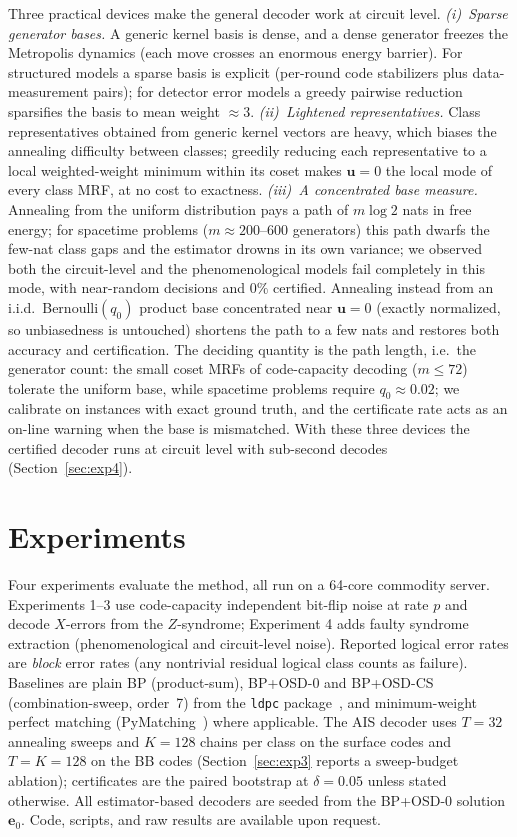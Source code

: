 \documentclass[a4paper,11pt]{quantumarticle}
\theoremstyle{definition}
\newcommand{\ve}{\boldsymbol{e}}
\newcommand{\vu}{\boldsymbol{u}}
\begin{document}
Three practical devices make the general decoder work at circuit level.
\emph{(i)~Sparse generator bases.} A generic kernel basis is dense, and a
dense generator freezes the Metropolis dynamics (each move crosses an
enormous energy barrier). For structured models a sparse basis is explicit
(per-round code stabilizers plus data-measurement pairs); for detector
error models a greedy pairwise reduction sparsifies the basis to mean
weight $\approx3$.
\emph{(ii)~Lightened representatives.} Class representatives obtained from
generic kernel vectors are heavy, which biases the annealing difficulty
between classes; greedily reducing each representative to a local
weighted-weight minimum within its coset makes $\vu=0$ the local mode of
every class MRF, at no cost to exactness.
\emph{(iii)~A concentrated base measure.} Annealing from the uniform
distribution pays a path of $m\log2$ nats in free energy; for spacetime
problems ($m\approx200$--$600$ generators) this path dwarfs the few-nat
class gaps and the estimator drowns in its own variance; we observed both
the circuit-level and the phenomenological models fail completely in this
mode, with near-random decisions and $0\%$ certified. Annealing instead
from an i.i.d.\ Bernoulli$(q_0)$ product base concentrated near $\vu=0$
(exactly normalized, so unbiasedness is untouched) shortens the path to a
few nats and restores both accuracy and certification. The deciding
quantity is the path length, i.e.\ the generator count: the small coset
MRFs of code-capacity decoding ($m\le72$) tolerate the uniform base, while
spacetime problems require $q_0\approx0.02$; we calibrate on instances
with exact ground truth, and the certificate rate acts as an on-line
warning when the base is mismatched. With these three devices the
certified decoder runs at circuit level with sub-second decodes
(Section~\ref{sec:exp4}).

\section{Experiments}
\label{sec:experiments}
Four experiments evaluate the method, all run on a 64-core commodity
server. Experiments 1--3 use code-capacity independent bit-flip noise at
rate $p$ and decode $X$-errors from the $Z$-syndrome; Experiment 4 adds
faulty syndrome extraction (phenomenological and circuit-level noise).
Reported logical error rates are \emph{block} error rates (any nontrivial
residual logical class counts as failure). Baselines are plain BP
(product-sum), BP+OSD-0 and BP+OSD-CS (combination-sweep, order~7) from the
\texttt{ldpc} package~\cite{roffe2020}, and minimum-weight perfect matching
(PyMatching~\cite{higgott2022}) where applicable. The AIS decoder uses
$T=32$ annealing sweeps and $K=128$ chains per class on the surface codes
and $T=K=128$ on the BB codes (Section~\ref{sec:exp3} reports a
sweep-budget ablation); certificates are the paired bootstrap at
$\delta=0.05$ unless stated otherwise. All estimator-based decoders are
seeded from the BP+OSD-0 solution $\ve_0$. Code, scripts, and raw results
are available upon request.
\end{document}
